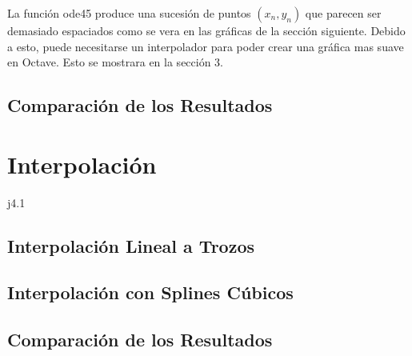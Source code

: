 \documentclass{endm}
\begin{document}
La función ode45 produce una sucesión de puntos $(x_n,y_n)$ que parecen ser demasiado espaciados como se vera
en las gráficas de la sección siguiente. Debido a esto, puede necesitarse un interpolador para poder crear una
gráfica mas suave en Octave. Esto se mostrara en la sección 3.

\subsection{Comparación de los Resultados}


\section{Interpolación}
 j4.1
\subsection{Interpolación Lineal a Trozos}


\subsection{Interpolación con Splines Cúbicos}


\subsection{Comparación de los Resultados}


\clearpage
\printbibliography
\end{document}
